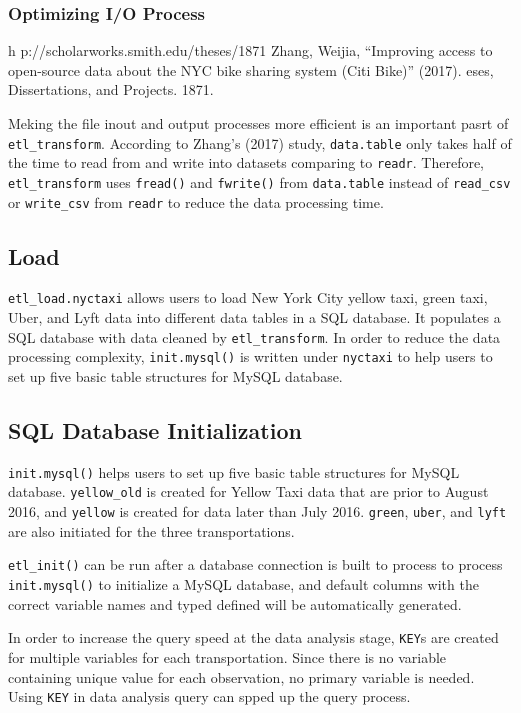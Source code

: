 \documentclass[12pt,twoside]{reedthesis}
\newenvironment{Shaded}{\begin{snugshade}}{\end{snugshade}}
\newcommand{\KeywordTok}[1]{\textcolor[rgb]{0.13,0.29,0.53}{\textbf{#1}}}
\newcommand{\StringTok}[1]{\textcolor[rgb]{0.31,0.60,0.02}{#1}}
\newcommand{\OperatorTok}[1]{\textcolor[rgb]{0.81,0.36,0.00}{\textbf{#1}}}
\newcommand{\NormalTok}[1]{#1}
\theoremstyle{definition}
\theoremstyle{definition}
\theoremstyle{definition}
\theoremstyle{remark}
\begin{document}
\subsubsection{Optimizing I/O Process}\label{optimizing-io-process}

h p://scholarworks.smith.edu/theses/1871 Zhang, Weijia, ``Improving
access to open-source data about the NYC bike sharing system (Citi
Bike)'' (2017). eses, Dissertations, and Projects. 1871.

Meking the file inout and output processes more efficient is an
important pasrt of \texttt{etl\_transform}. According to Zhang's (2017)
study, \texttt{data.table} only takes half of the time to read from and
write into datasets comparing to \texttt{readr}. Therefore,
\texttt{etl\_transform} uses \texttt{fread()} and \texttt{fwrite()} from
\texttt{data.table} instead of \texttt{read\_csv} or \texttt{write\_csv}
from \texttt{readr} to reduce the data processing time.

\subsection{Load}\label{load}

\texttt{etl\_load.nyctaxi} allows users to load New York City yellow
taxi, green taxi, Uber, and Lyft data into different data tables in a
SQL database. It populates a SQL database with data cleaned by
\texttt{etl\_transform}. In order to reduce the data processing
complexity, \texttt{init.mysql()} is written under \texttt{nyctaxi} to
help users to set up five basic table structures for MySQL database.

\subsection{SQL Database
Initialization}\label{sql-database-initialization}

\texttt{init.mysql()} helps users to set up five basic table structures
for MySQL database. \texttt{yellow\_old} is created for Yellow Taxi data
that are prior to August 2016, and \texttt{yellow} is created for data
later than July 2016. \texttt{green}, \texttt{uber}, and \texttt{lyft}
are also initiated for the three transportations.

\texttt{etl\_init()} can be run after a database connection is built to
process to process \texttt{init.mysql()} to initialize a MySQL database,
and default columns with the correct variable names and typed defined
will be automatically generated.
\begin{Shaded}
\end{Shaded}
In order to increase the query speed at the data analysis stage,
\texttt{KEY}s are created for multiple variables for each
transportation. Since there is no variable containing unique value for
each observation, no primary variable is needed. Using \texttt{KEY} in
data analysis query can spped up the query process.
\end{document}

